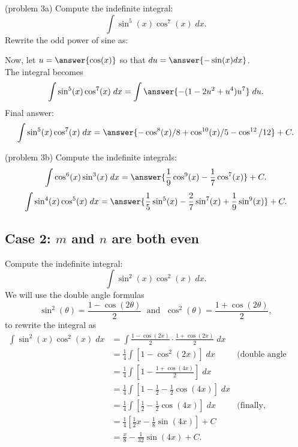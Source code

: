\documentclass{ximera}
\begin{document}
\begin{problem}(problem 3a)
Compute the indefinite integral:
\[
\int \sin^5(x)\cos^7(x) \; dx.
\]
Rewrite the odd power of sine as:
\begin{multipleChoice}

\end{multipleChoice}

Now, let $u = \answer{\cos(x)}$ so that $du = \answer{-\sin(x) dx}$.\\
The integral becomes
\[
\int \sin^5(x)\cos^7(x) \; dx= \int \answer{-(1-2u^2 + u^4)u^7} \; du.
\]
Final answer:
\[
\int \sin^5(x)\cos^7(x) \; dx= \answer{-\cos^8(x)/8 + \cos^{10}(x)/5 - \cos^{12}/12} + C.
\]
\end{problem}



\begin{problem}(problem 3b)
Compute the indefinite integrals:
\[
\int \cos^6(x)\sin^3(x) \; dx = \answer{\frac19 \cos^9(x) - \frac17 \cos^7(x)} + C.
\]
\[
\int \sin^4(x)\cos^5(x) \; dx = \answer{\frac15 \sin^5(x) - \frac27 \sin^7(x)+\frac19 \sin^9(x)} + C.
\]
\end{problem}

\subsection{Case 2: $m$ and $n$ are both even}
\begin{example}
Compute the indefinite integral:
\[
\int \sin^2(x)\cos^2(x) \; dx.
\]
We will use the double angle formulas
\[
\sin^2(\theta) = \frac{1-\cos(2\theta)}{2} \; \text{ and } \; \cos^2(\theta) = \frac{1+\cos(2\theta)}{2},
\]
to rewrite the integral as
\begin{align*}
\int \sin^2(x)\cos^2(x) \; dx &= \int \frac{1-\cos(2x)}{2}\cdot \frac{1+\cos(2x)}{2} \; dx\\
  &= \frac14 \int \left[1 - \cos^2(2x)\right] \; dx &
  \text{(double angle formula again)}\\
  &= \frac14 \int \left[ 1- \frac{1+\cos(4x)}{2}\right] \; dx\\
  &= \frac14 \int \left[1-\frac12 - \frac12\cos(4x)\right] \; dx\\
  &= \frac14 \int \left[\frac12 - \frac12\cos(4x)\right] \; dx & \text{(finally, integrate)}\\
  &= \frac14 \left[\frac12 x  - \frac18\sin(4x)\right] + C\\
  &= \frac{x}{8}  - \frac{1}{32}\sin(4x) + C.
\end{align*}
\end{example}
\end{document}
